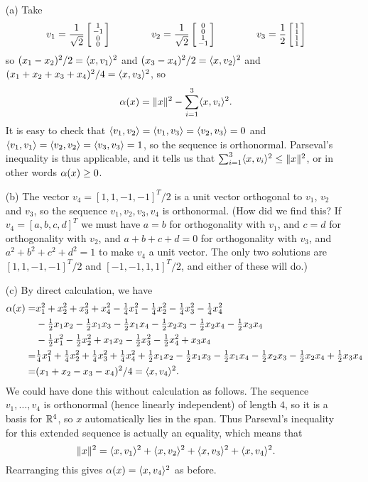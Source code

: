  \begin{itemize}
  \item[(a)] Take
   \[ v_1 = \frac{1}{\sqrt{2}}\left[\begin{smallmatrix} 1 \\ -1\\ 0 \\ 0 \end{smallmatrix}\right] \hspace{4em}
      v_2 = \frac{1}{\sqrt{2}}\left[\begin{smallmatrix} 0 \\ 0\\ 1 \\ -1 \end{smallmatrix}\right] \hspace{4em}
      v_3 = \frac{1}{2} \left[\begin{smallmatrix} 1\\ 1\\ 1\\ 1 \end{smallmatrix}\right]
   \]
   so $(x_1-x_2)^2/2=\langle x,v_1\rangle^2$ and $(x_3-x_4)^2/2=\langle x,v_2\rangle^2$
   and $(x_1+x_2+x_3+x_4)^2/4=\langle x,v_3\rangle^2$, so
   \[ \alpha(x) = \|x\|^2 - \sum_{i=1}^3 \langle x,v_i\rangle^2. \]
   It is easy to check that $\langle v_1,v_2\rangle=\langle v_1,v_3\rangle=\langle v_2,v_3\rangle=0$
   and $\langle v_1,v_1\rangle=\langle v_2,v_2\rangle=\langle v_3,v_3\rangle=1$, so the sequence is
   orthonormal.  Parseval's inequality is thus applicable, and it
   tells us that $\sum_{i=1}^3\langle x,v_i\rangle^2\leq\|x\|^2$, or in other
   words $\alpha(x)\geq 0$.
  \item[(b)] The vector $v_4=[1,1,-1,-1]^T/2$ is a unit vector
   orthogonal to $v_1$, $v_2$ and $v_3$, so the sequence
   $v_1,v_2,v_3,v_4$ is orthonormal.  (How did we find this?  If
   $v_4=[a,b,c,d]^T$ we must have $a=b$ for orthogonality with $v_1$,
   and $c=d$ for orthogonality with $v_2$, and $a+b+c+d=0$ for
   orthogonality with $v_3$, and $a^2+b^2+c^2+d^2=1$ to make $v_4$ a
   unit vector.  The only two solutions are $[1,1,-1,-1]^T/2$ and
   $[-1,-1,1,1]^T/2$, and either of these will do.)
  \item[(c)] By direct calculation, we have
   \begin{align*}
    \alpha(x) =&
     x_1^2+x_2^2+x_3^2+x_4^2 -
     {\tfrac{1}{4}} x_1^2 - {\tfrac{1}{4}} x_2^2 - {\tfrac{1}{4}} x_3^2 - {\tfrac{1}{4}} x_4^2 \\ &
     - {\textstyle\frac{1}{2}} x_1x_2 - {\textstyle\frac{1}{2}} x_1x_3 - {\textstyle\frac{1}{2}} x_1x_4
     - {\textstyle\frac{1}{2}} x_2x_3 - {\textstyle\frac{1}{2}} x_2x_4 - {\textstyle\frac{1}{2}} x_3x_4 \\ &
     - {\textstyle\frac{1}{2}} x_1^2 - {\textstyle\frac{1}{2}} x_2^2 + x_1x_2
     - {\textstyle\frac{1}{2}} x_3^2 - {\textstyle\frac{1}{2}} x_4^2 + x_3x_4 \\
     =& {\tfrac{1}{4}} x_1^2 + {\tfrac{1}{4}} x_2^2 + {\tfrac{1}{4}} x_3^2 + {\tfrac{1}{4}} x_4^2
     + {\textstyle\frac{1}{2}} x_1x_2 - {\textstyle\frac{1}{2}} x_1x_3 - {\textstyle\frac{1}{2}} x_1x_4
     - {\textstyle\frac{1}{2}} x_2x_3 - {\textstyle\frac{1}{2}} x_2x_4 + {\textstyle\frac{1}{2}} x_3x_4 \\
     =& (x_1+x_2-x_3-x_4)^2/4 = \langle x,v_4\rangle^2.
   \end{align*}
   We could have done this without calculation as follows.  The
   sequence $v_1,\dotsc,v_4$ is orthonormal (hence linearly
   independent) of length $4$, so it is a basis for ${\mathbb{R}}^4$, so $x$ automatically
   lies in the span.  Thus Parseval's inequality for this extended
   sequence is actually an equality, which means that
   \[ \|x\|^2 =
        \langle x,v_1\rangle^2 + \langle x,v_2\rangle^2 + \langle x,v_3\rangle^2 + \langle x,v_4\rangle^2.
   \]
   Rearranging this gives $\alpha(x)=\langle x,v_4\rangle^2$ as before.
 \end{itemize}
\EndDeferredSolution

